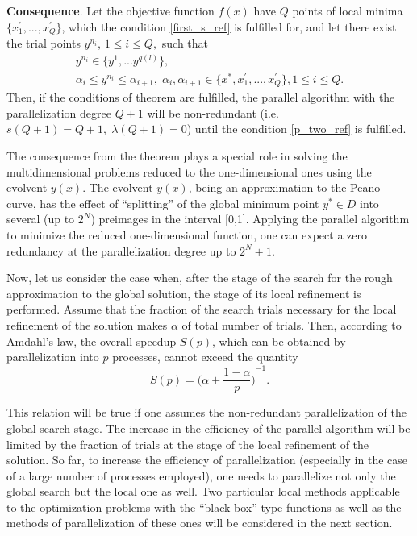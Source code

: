 \documentclass[runningheads]{llncs}
\begin{document}
\textbf{Consequence}. Let the objective function $f(x)$ have $Q$ points of local minima $\{x_1^{\prime},...,x_Q^{\prime}\}$, which the condition \eqref{first_s_ref} is fulfilled for, and let there exist the trial points $y^{n_i}$, $1 \leq i \leq Q,$ such that 
\begin{gather} 
    y^{n_i} \in \{y^1,...y^{q(l)}\}, \nonumber \\ 
    \alpha_i \leq y^{n_i} \leq \alpha_{i+1}, \; \alpha_i, \alpha_{i+1} \in \{x^*, x_1^{\prime},...,x_Q^{\prime}\}, 1 \leq i \leq Q. \nonumber
\end{gather}
Then, if the conditions of theorem are fulfilled, the parallel algorithm with the parallelization degree $Q+1$ will be non-redundant (i.e. $s(Q+1)=Q+1, \; \lambda(Q+1)=0$) until the condition \eqref{p_two_ref} is fulfilled.

The consequence from the theorem plays a special role in solving the multidimensional problems reduced to the one-dimensional ones using the evolvent $y(x)$. The evolvent $y(x)$, being an approximation to the Peano curve, has the effect of ``splitting'' of the global minimum point $y^* \in D$ into several (up to $2^N$) preimages in the interval [0,1]. Applying the parallel algorithm to minimize the reduced one-dimensional function, one can expect a zero redundancy at the parallelization degree up to $2^N+1$.

Now, let us consider the case when, after the stage of the search for the rough approximation to the global solution, the stage of its local refinement is performed. Assume that the fraction of the search trials necessary for the local refinement of the solution makes $\alpha$ of total number of trials. Then, according to Amdahl's law, the overall speedup $S(p)$, which can be obtained by parallelization into $p$ processes, cannot exceed the quantity 
$$ S(p) = {\Big(\alpha + \frac{1-\alpha}{p}\Big)}^{-1}.$$

This relation will be true if one assumes the non-redundant parallelization of the global search stage. The increase in the efficiency of the parallel algorithm will be limited by the fraction of trials at the stage of the local refinement of the solution. So far, to increase the efficiency of parallelization (especially in the case of a large number of processes employed), one needs to parallelize not only the global search but the local one as well. Two particular local methods applicable to the optimization problems with the ``black-box'' type functions as well as the methods of parallelization of these ones will be considered in the next section.
\end{document}
